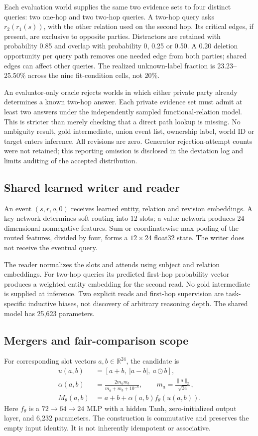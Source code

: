 \documentclass[10pt]{article}
\begin{document}
Each evaluation world supplies the same two evidence sets to four distinct
queries: two one-hop and two two-hop queries. A two-hop query asks
$r_2(r_1(s))$, with the other relation used on the second hop. Its critical
edges, if present, are exclusive to opposite parties. Distractors are retained
with probability 0.85 and overlap with probability 0, 0.25 or 0.50. A 0.20
deletion opportunity per query path removes one needed edge from both parties;
shared edges can affect other queries. The realized unknown-label fraction is
23.23--25.50\% across the nine fit-condition cells, not 20\%.

An evaluator-only oracle rejects worlds in which either private party already
determines a known two-hop answer. Each private evidence set must admit at least
two answers under the independently sampled functional-relation model.
This is stricter than merely checking that a direct path lookup is missing.
No ambiguity result, gold intermediate, union event list, ownership label,
world ID or target enters inference. All revisions are zero. Generator
rejection-attempt counts were not retained; this reporting omission is disclosed
in the deviation log and limits auditing of the accepted distribution.

\subsection{Shared learned writer and reader}
An event $(s,r,o,0)$ receives learned entity, relation and revision embeddings.
A key network determines soft routing into 12 slots; a value network produces
24-dimensional nonnegative features. Sum or coordinatewise max pooling of
the routed features, divided by four, forms a $12\times24$ float32 state.
The writer does not receive the eventual query.

The reader normalizes the slots and attends using subject and relation
embeddings. For two-hop queries its predicted first-hop probability vector
produces a weighted entity embedding for the second read. No gold intermediate
is supplied at inference. Two explicit reads and first-hop supervision are
task-specific inductive biases, not discovery of arbitrary reasoning depth.
The shared model has 25,623 parameters.

\subsection{Mergers and fair-comparison scope}
For corresponding slot vectors $a,b\in\mathbb R^{24}$, the candidate is
\begin{align}
u(a,b)&=[a+b,\ |a-b|,\ a\odot b],\\
\alpha(a,b)&=\frac{2m_am_b}{m_a+m_b+10^{-8}},\qquad
m_a=\frac{\|a\|_2}{\sqrt{24}},\\
M_\theta(a,b)&=a+b+\alpha(a,b)f_\theta(u(a,b)).
\end{align}
Here $f_\theta$ is a $72\rightarrow64\rightarrow24$ MLP with a hidden Tanh,
zero-initialized output layer, and 6,232 parameters. The construction is
commutative and preserves the empty input identity. It is not inherently
idempotent or associative.
\end{document}
